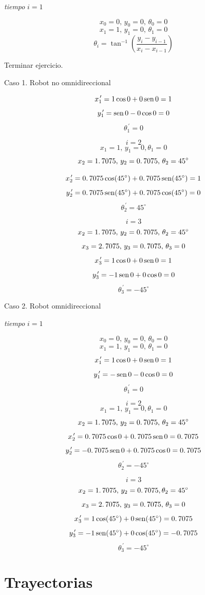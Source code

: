 \textit{tiempo} $i = 1$

$$x_{0} = 0,\, y_{0} = 0, \, \theta_{0} = 0$$
$$x_{1} = 1,\, y_{1} = 0, \, \theta_{1} = 0$$
$$\theta_{i} = \tan^{-1} \left( \dfrac{y_{i} - y_{i - 1}}{x_{i} - x_{i - 1}} \right) $$

Terminar ejercicio.

Caso 1. Robot no omnidireccional

$$x_{1}^{\, \prime} = 1 \cos 0 + 0 \mathop{\rm sen}\nolimits 0 = 1$$
$$y_{1}^{\, \prime} = \mathop{\rm sen}\nolimits 0 - 0 \cos 0 = 0$$
$$\theta_{1}^{\, \prime} = 0$$
	
$$i = 2$$
$$x_{1} = 1, \, y_{1} = 0, \theta_{1} = 0$$
$$x_{2} = 1\ldotp 7075,\, y_{2} = 0\ldotp 7075, \, \theta_{2} = 45^\circ$$

$$x_{2}^{\, \prime} = 0\ldotp7075 \cos (45^\circ) + 0\ldotp7075 \mathop{\rm sen}\nolimits (45^\circ) = 1$$
$$y_{2}^{\, \prime} = 0\ldotp7075 \mathop{\rm sen}\nolimits (45^\circ) + 0\ldotp7075 \cos (45^\circ) = 0$$
$$\theta_{2}^{\, \prime} = 45^\circ$$

$$i = 3$$
$$x_{2} = 1\ldotp7075,\, y_{2} = 0\ldotp7075,\, \theta_{2} = 45^\circ$$
$$x_{3} = 2\ldotp7075,\, y_{3} = 0\ldotp7075,\, \theta_{3} = 0$$
$$x_{3}^{\,\prime} = 1 \cos 0 + 0\mathop{\rm sen}\nolimits 0 = 1$$
$$y_{3}^{\,\prime} = - 1 \mathop{\rm sen}\nolimits 0 + 0\cos 0 = 0$$
$$\theta_{3}^{\,\prime} = -45^\circ$$

Caso 2. Robot omnidireccional 

\textit{tiempo} $i = 1$

$$x_{0} = 0,\, y_{0} = 0,\, \theta_{0} = 0$$
$$x_{1} = 1,\, y_{1} = 0,\, \theta_{1} = 0$$
$$x_{1}^{\,\prime} = 1 \cos 0 + 0\mathop{\rm sen}\nolimits 0 = 1$$
$$y_{1}^{\,\prime} = - \mathop{\rm sen}\nolimits 0 - 0\cos 0 = 0$$
$$\theta_{1}^{\,\prime} = 0$$

$$i = 2$$
$$x_{1} = 1, \, y_{1} = 0, \theta_{1} = 0$$
$$x_{2} = 1\ldotp7075,\, y_{2} = 0\ldotp7075,\, \theta_{2} = 45^\circ$$
$$x_{2}^{\,\prime} = 0\ldotp7075 \cos 0 + 0\ldotp7075\mathop{\rm sen}\nolimits 0 = 0\ldotp7075$$
$$y_{2}^{\,\prime} = - 0\ldotp7075 \mathop{\rm sen}\nolimits 0 + 0\ldotp7075\cos 0 = 0\ldotp7075$$
$$\theta_{2}^{\,\prime} = -45^\circ$$

$$i = 3$$
$$x_{2} = 1\ldotp7075, \, y_{2} = 0\ldotp7075, \theta_{2} = 45^\circ$$
$$x_{3} = 2\ldotp7075,\, y_{3} = 0\ldotp7075,\, \theta_{3} = 0$$
$$x_{3}^{\,\prime} = 1 \cos (45^\circ) + 0\mathop{\rm sen}\nolimits (45^\circ) = 0\ldotp7075$$
$$y_{3}^{\,\prime} = - 1 \mathop{\rm sen}\nolimits (45^\circ) + 0 \cos (45^\circ) = -0\ldotp7075$$
$$\theta_{3}^{\,\prime} = -45^\circ$$



\section{Trayectorias}

